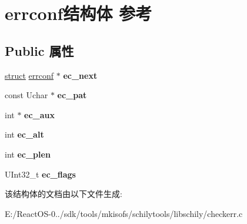 \hypertarget{structerrconf}{}\section{errconf结构体 参考}
\label{structerrconf}
\subsection*{Public 属性}
\begin{DoxyCompactItemize}
\item 
\mbox{\label{structerrconf_acde99965f24c1aa1b8640a852593639c}} 
\hyperlink{interfacestruct}{struct} \hyperlink{structerrconf}{errconf} $\ast$ {\bfseries ec\+\_\+next}
\item 
\mbox{\label{structerrconf_a7212e968038fea0cf44bf17ca8267b1e}} 
const Uchar $\ast$ {\bfseries ec\+\_\+pat}
\item 
\mbox{\label{structerrconf_ada5b6a54b997de9ed826b00550f63926}} 
int $\ast$ {\bfseries ec\+\_\+aux}
\item 
\mbox{\label{structerrconf_aef90a5c71699adcaab5b54ee9849375f}} 
int {\bfseries ec\+\_\+alt}
\item 
\mbox{\label{structerrconf_a4eb9aeaa3c8aaaf62414b9b16f04447b}} 
int {\bfseries ec\+\_\+plen}
\item 
\mbox{\label{structerrconf_a4444badcde868dc8259131eda9ab4d22}} 
U\+Int32\+\_\+t {\bfseries ec\+\_\+flags}
\end{DoxyCompactItemize}


该结构体的文档由以下文件生成\+:\begin{DoxyCompactItemize}
\item 
E\+:/\+React\+O\+S-\/0../sdk/tools/mkisofs/schilytools/libschily/checkerr.\+c\end{DoxyCompactItemize}
